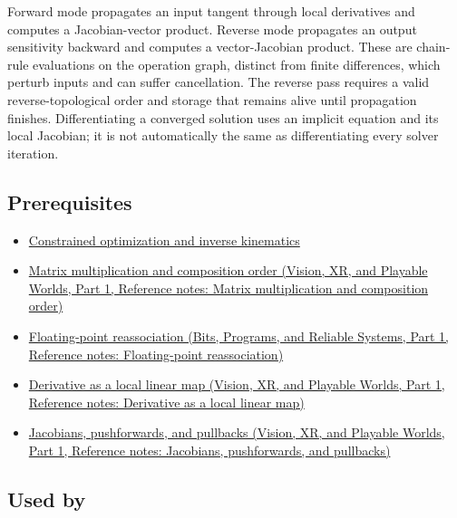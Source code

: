 \hypertarget{appendix-40df0855b4a7-phase-910-development}{}

Forward mode propagates an input tangent through local derivatives and computes a Jacobian-vector product. Reverse mode propagates an output sensitivity backward and computes a vector-Jacobian product. These are chain-rule evaluations on the operation graph, distinct from finite differences, which perturb inputs and can suffer cancellation. The reverse pass requires a valid reverse-topological order and storage that remains alive until propagation finishes. Differentiating a converged solution uses an implicit equation and its local Jacobian; it is not automatically the same as differentiating every solver iteration.

\subsection{Prerequisites}\label{appendix-40df0855b4a7-prerequisites}

\hypertarget{appendix-40df0855b4a7-prerequisites}{}

\begin{itemize}
\tightlist
\item
  \hyperref[appendix-29f4bea4c2bb]{Constrained optimization and inverse kinematics}
\item
  \href{../07-Vision-XR-and-Playable-Worlds-P01/main.pdf\#nameddest=appendix-ab31ef447dbf}{Matrix multiplication and composition order (Vision, XR, and Playable Worlds, Part 1, Reference notes: Matrix multiplication and composition order)}
\item
  \href{../01-Bits-Programs-and-Reliable-Systems-P01/main.pdf\#nameddest=appendix-c2ac4a84c283}{Floating-point reassociation (Bits, Programs, and Reliable Systems, Part 1, Reference notes: Floating-point reassociation)}
\item
  \href{../07-Vision-XR-and-Playable-Worlds-P01/main.pdf\#nameddest=appendix-7bc181935c42}{Derivative as a local linear map (Vision, XR, and Playable Worlds, Part 1, Reference notes: Derivative as a local linear map)}
\item
  \href{../07-Vision-XR-and-Playable-Worlds-P01/main.pdf\#nameddest=appendix-d8a7ddb675eb}{Jacobians, pushforwards, and pullbacks (Vision, XR, and Playable Worlds, Part 1, Reference notes: Jacobians, pushforwards, and pullbacks)}
\end{itemize}

\subsection{Used by}\label{appendix-40df0855b4a7-used-by}

